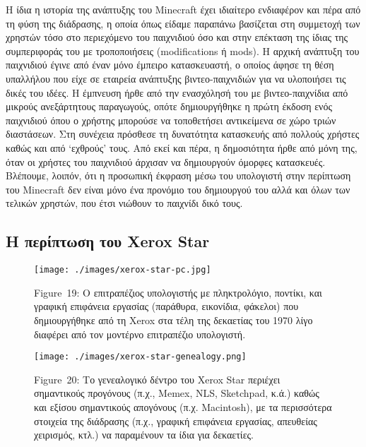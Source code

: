 \documentclass[
]{article}
\begin{document}
Η ίδια η ιστορία της ανάπτυξης του Minecraft έχει ιδιαίτερο ενδιαφέρον
και πέρα από τη φύση της διάδρασης, η οποία όπως είδαμε παραπάνω
βασίζεται στη συμμετοχή των χρηστών τόσο στο περιεχόμενο του παιχνιδιού
όσο και στην επέκταση της ίδιας της συμπεριφοράς του με τροποποιήσεις
(modifications ή mods). Η αρχική ανάπτυξη του παιχνιδιού έγινε από έναν
μόνο έμπειρο κατασκευαστή, ο οποίος άφησε τη θέση υπαλλήλου που είχε σε
εταιρεία ανάπτυξης βιντεο-παιχνιδιών για να υλοποιήσει τις δικές του
ιδέες. Η έμπνευση ήρθε από την ενασχόλησή του με βιντεο-παιχνίδια από
μικρούς ανεξάρτητους παραγωγούς, οπότε δημιουργήθηκε η πρώτη έκδοση ενός
παιχνιδιού όπου ο χρήστης μπορούσε να τοποθετήσει αντικείμενα σε χώρο
τριών διαστάσεων. Στη συνέχεια πρόσθεσε τη δυνατότητα κατασκευής από
πολλούς χρήστες καθώς και από `εχθρούς' τους. Από εκεί και πέρα, η
δημοσιότητα ήρθε από μόνη της, όταν οι χρήστες του παιχνιδιού άρχισαν να
δημιουργούν όμορφες κατασκευές. Βλέπουμε, λοιπόν, ότι η προσωπική
έκφραση μέσω του υπολογιστή στην περίπτωση του Minecraft δεν είναι μόνο
ένα προνόμιο του δημιουργού του αλλά και όλων των τελικών χρηστών, που
έτσι νιώθουν το παιχνίδι δικό τους.

\hypertarget{ux3b7-ux3c0ux3b5ux3c1ux3afux3c0ux3c4ux3c9ux3c3ux3b7-ux3c4ux3bfux3c5-xerox-star}{%
\subsection{Η περίπτωση του Xerox
Star}\label{ux3b7-ux3c0ux3b5ux3c1ux3afux3c0ux3c4ux3c9ux3c3ux3b7-ux3c4ux3bfux3c5-xerox-star}}

\leavevmode{}%
\begin{figure}
\hypertarget{fig:xerox-star-pc}{%
\centering
\texttt{[image: ./images/xerox-star-pc.jpg]}
\caption{Figure~19: Ο επιτραπέζιος υπολογιστής με πληκτρολόγιο, ποντίκι,
και γραφική επιφάνεια εργασίας (παράθυρα, εικονίδια, φάκελοι) που
δημιουργήθηκε από τη Xerox στα τέλη της δεκαετίας του 1970 λίγο διαφέρει
από τον μοντέρνο επιτραπέζιο υπολογιστή.}\label{fig:xerox-star-pc}
}
\end{figure}

\leavevmode{}%
\begin{figure}
\hypertarget{fig:xerox-star-genealogy}{%
\centering
\texttt{[image: ./images/xerox-star-genealogy.png]}
\caption{Figure~20: Το γενεαλογικό δέντρο του Xerox Star περιέχει
σημαντικούς προγόνους (π.χ., Memex, NLS, Sketchpad, κ.ά.) καθώς και
εξίσου σημαντικούς απογόνους (π.χ. Macintosh), με τα περισσότερα
στοιχεία της διάδρασης (π.χ., γραφική επιφάνεια εργασίας, απευθείας
χειρισμός, κτλ.) να παραμένουν τα ίδια για
δεκαετίες.}\label{fig:xerox-star-genealogy}
}
\end{figure}
\end{document}
